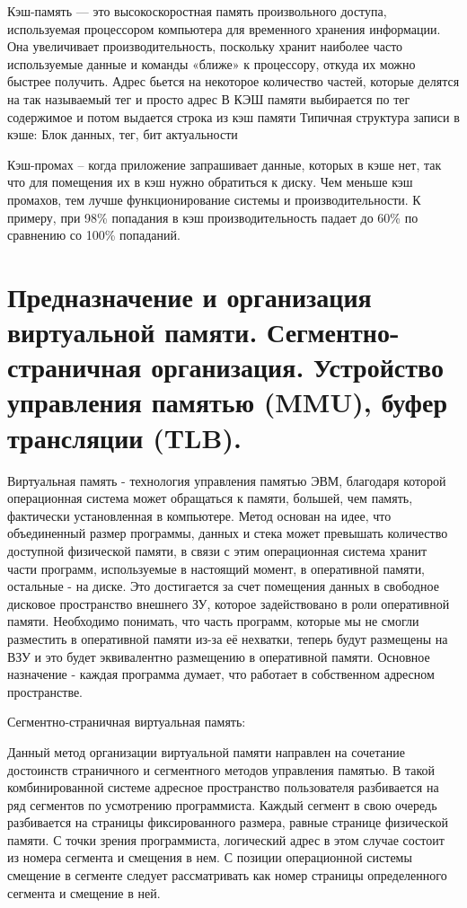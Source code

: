 \documentclass{article}
\begin{document}
Кэш-память — это высокоскоростная память произвольного доступа, используемая процессором компьютера для временного хранения информации. 
Она увеличивает производительность, поскольку хранит наиболее часто используемые данные и команды «ближе» к процессору, откуда их можно быстрее получить. Адрес бьется на некоторое количество частей, которые делятся на так называемый тег и просто адрес
В КЭШ памяти выбирается по тег содержимое и потом выдается строка из кэш памяти
Типичная структура записи в кэше: Блок данных, тег, бит актуальности

Кэш-промах – когда приложение запрашивает данные, которых в кэше нет, так что для помещения их в кэш нужно обратиться к диску. 
Чем меньше кэш промахов, тем лучше функционирование системы и производительности. К примеру, при 98\% попадания в кэш производительность
 падает до 60\% по сравнению со 100\% попаданий.


\section{Предназначение и организация виртуальной памяти. Сегментно-страничная организация. Устройство управления памятью (MMU), буфер трансляции (TLB).}

Виртуальная память - технология управления памятью ЭВМ, благодаря которой операционная система может обращаться к памяти, большей, чем память, фактически установленная в компьютере. 
Метод основан на идее, что объединенный размер программы, данных и стека может превышать количество доступной физической памяти, в связи с этим операционная система хранит части программ, 
используемые в настоящий момент, в оперативной памяти, остальные - на диске.
Это достигается за счет помещения данных в свободное дисковое пространство внешнего ЗУ, которое задействовано в роли оперативной памяти. 
Необходимо понимать, что часть программ, которые мы не смогли разместить в оперативной памяти из-за её нехватки, 
теперь будут размещены на ВЗУ и это будет эквивалентно размещению в оперативной памяти. 
Основное назначение - каждая программа думает, что работает в собственном адресном пространстве.


Сегментно-страничная виртуальная память:


Данный метод организации виртуальной памяти направлен на сочетание достоинств страничного и сегментного методов управления памятью. 
В такой комбинированной системе адресное пространство пользователя разбивается на ряд сегментов по усмотрению программиста. 
Каждый сегмент в свою очередь разбивается на страницы фиксированного размера, равные странице физической памяти. 
С точки зрения программиста, логический адрес в этом случае состоит из номера сегмента и смещения в нем. 
С позиции операционной системы смещение в сегменте следует рассматривать как номер страницы определенного сегмента и смещение в ней.
\end{document}
